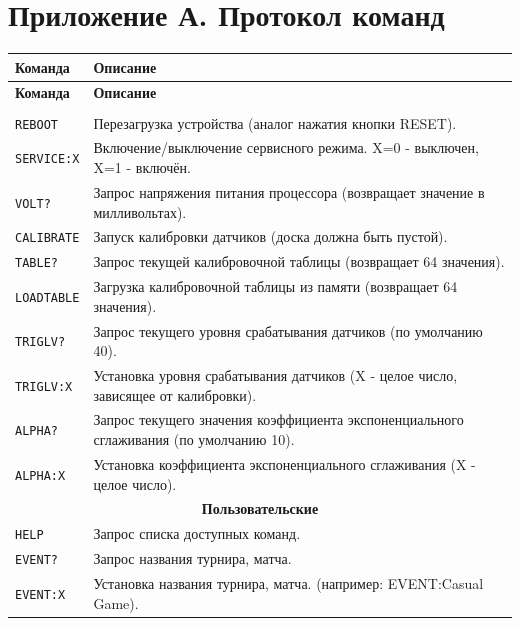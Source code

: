 \documentclass[a4paper,12pt]{article}
\begin{document}
\newpage

\clearpage
\section*{Приложение А. Протокол команд}
\label{sec:protocol}

\begin{longtable}{|p{}|p{}|}
\hline
\textbf{Команда} & \textbf{Описание} \\ \hline
\endfirsthead
\hline
\textbf{Команда} & \textbf{Описание} \\ \hline
\endhead
\hline
\endfoot
\multicolumn{2}{|c|}{\textbf{Служебные}} \\ \hline
\texttt{REBOOT} & Перезагрузка устройства (аналог нажатия кнопки RESET). \\ \hline
\texttt{SERVICE:X} & Включение/выключение сервисного режима. X=0 - выключен, X=1 - включён. \\ \hline
\texttt{VOLT?} & Запрос напряжения питания процессора (возвращает значение в милливольтах). \\ \hline
\texttt{CALIBRATE} & Запуск калибровки датчиков (доска должна быть пустой). \\ \hline
\texttt{TABLE?} & Запрос текущей калибровочной таблицы (возвращает 64 значения). \\ \hline
\texttt{LOADTABLE} & Загрузка калибровочной таблицы из памяти (возвращает 64 значения). \\ \hline
\texttt{TRIGLV?} & Запрос текущего уровня срабатывания датчиков (по умолчанию 40). \\ \hline
\texttt{TRIGLV:X} & Установка уровня срабатывания датчиков (X - целое число, зависящее от калибровки). \\ \hline
\texttt{ALPHA?} & Запрос текущего значения коэффициента экспоненциального сглаживания (по умолчанию 10). \\ \hline
\texttt{ALPHA:X} & Установка коэффициента экспоненциального сглаживания (X - целое число). \\ \hline
\multicolumn{2}{|c|}{\textbf{Пользовательские}} \\ \hline
\texttt{HELP} & Запрос списка доступных команд. \\ \hline
\texttt{EVENT?} & Запрос названия турнира, матча. \\ \hline
\texttt{EVENT:X} & Установка названия турнира, матча. (например: EVENT:Casual Game). \\ \hline

\end{longtable}
\end{document}
